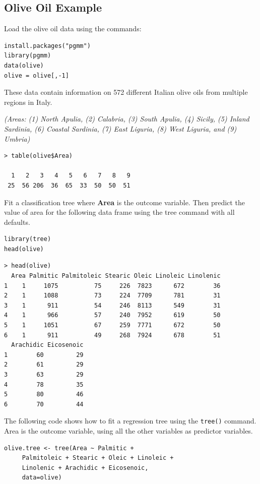 \documentclass[caret-main.tex]{subfiles}
\begin{document}
\subsection{Olive Oil Example}

Load the olive oil data using the commands:
\begin{framed}
\begin{verbatim}
install.packages("pgmm")
library(pgmm)
data(olive)
olive = olive[,-1]
\end{verbatim}
\end{framed}
\noindent These data contain information on 572 different Italian olive oils from multiple regions in Italy. 

\noindent \textit{(Areas: (1) North Apulia, (2) Calabria, (3) South Apulia, (4) Sicily, (5) Inland Sardinia, (6) Coastal Sardinia, (7) East Liguria, (8) West Liguria, and (9) Umbria)}
\begin{verbatim}
> table(olive$Area)

  1   2   3   4   5   6   7   8   9 
 25  56 206  36  65  33  50  50  51
\end{verbatim}
\noindent Fit a classification tree where \textbf{Area} is the outcome variable.
Then predict the value of area for the following data frame using the tree
command with all defaults.


\newpage
\begin{framed}
\begin{verbatim}
library(tree)
head(olive)
\end{verbatim}
\end{framed}
\begin{verbatim}
> head(olive)
  Area Palmitic Palmitoleic Stearic Oleic Linoleic Linolenic
1    1     1075          75     226  7823      672        36
2    1     1088          73     224  7709      781        31
3    1      911          54     246  8113      549        31
4    1      966          57     240  7952      619        50
5    1     1051          67     259  7771      672        50
6    1      911          49     268  7924      678        51
  Arachidic Eicosenoic
1        60         29
2        61         29
3        63         29
4        78         35
5        80         46
6        70         44
\end{verbatim}
The following code shows how to fit a regression tree using the \texttt{tree()} command. Area is the outcome variable, using all the other variables as predictor variables.
\begin{framed}
\begin{verbatim}
olive.tree <- tree(Area ~ Palmitic + 
     Palmitoleic + Stearic + Oleic + Linoleic + 
     Linolenic + Arachidic + Eicosenoic, 
     data=olive)
\end{verbatim}
\end{framed}
\end{document}
